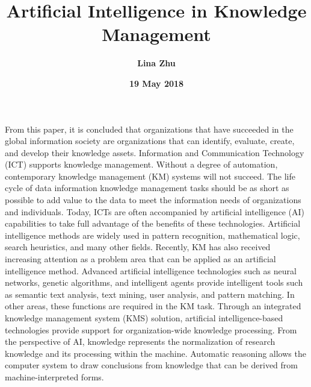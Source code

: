 \documentclass[a4paper,12pt,twocolumn]{article}
\begin{document}
 \title{\textbf{\bfseries \LARGE Artificial Intelligence in Knowledge Management} }
\author{\textbf{Lina Zhu}}
\date{\textbf{19 May 2018}}
\maketitle
	\par From this paper, it is concluded that organizations that have succeeded in the global information society are organizations that can identify, evaluate, create, and develop their knowledge assets. Information and Communication Technology (ICT) supports knowledge management. Without a degree of automation, contemporary knowledge management (KM) systems will not succeed. The life cycle of data information knowledge management tasks should be as short as possible to add value to the data to meet the information needs of organizations and individuals. Today, ICTs are often accompanied by artificial intelligence (AI) capabilities to take full advantage of the benefits of these technologies. Artificial intelligence methods are widely used in pattern recognition, mathematical logic, search heuristics, and many other fields. Recently, KM has also received increasing attention as a problem area that can be applied as an artificial intelligence method. Advanced artificial intelligence technologies such as neural networks, genetic algorithms, and intelligent agents provide intelligent tools such as semantic text analysis, text mining, user analysis, and pattern matching. In other areas, these functions are required in the KM task. Through an integrated knowledge management system (KMS) solution, artificial intelligence-based technologies provide support for organization-wide knowledge processing. From the perspective of AI, knowledge represents the normalization of research knowledge and its processing within the machine. Automatic reasoning allows the computer system to draw conclusions from knowledge that can be derived from machine-interpreted forms.
\end{document}
